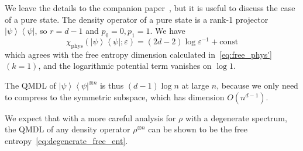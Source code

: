\documentclass[aps,pre,twocolumn,superscriptaddress,amsmath,amssymb,reprint]{revtex4-2}
\newcommand{\ketbra}[2]{\left|#1\right\rangle\!\!\left\langle #2\right|}
\def\eps{\varepsilon}
\begin{document}
We leave the details to the companion paper~\cite{paper2}, but it is useful to discuss the case of a pure state. The density operator of a pure state is a rank-1 projector $\ketbra{\psi}{\psi}$, so $r=d-1$ and $p_0=0, p_1=1$. We have
\begin{equation}
    \chi_\mathrm{phys}(\ketbra{\psi}{\psi};\eps) = (2d-2)\log \eps^{-1} + \mathrm{const}
\end{equation}
which agrees with the free entropy dimension calculated in~\eqref{eq:free_phys'}$(k=1)$, and the logarithmic potential term vanishes on $\log 1$.

The QMDL of $\ketbra{\psi}{\psi}^{\otimes n}$ is thus $(d-1)\log n$ at large $n$, because we only need to compress to the symmetric subspace, which has dimension $O(n^{d-1})$.

We expect that with a more careful analysis for $\rho$ with a degenerate spectrum, the QMDL of any density operator $\rho^{\otimes n}$ can be shown to be the free entropy~\eqref{eq:degenerate_free_ent}.




\end{document}
